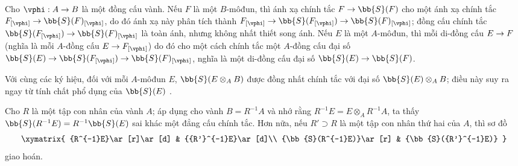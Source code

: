 \documentclass[oneside,10pt]{amsart}
\makeatletter
\newcommand{\ega@arrow}[2]{\mathchoice{#1}{#2}{#2}{#2}}
\renewcommand{\to}{\ega@arrow{\longrightarrow}{\rightarrow}}
\let\EGAOriginalLabel\label
\renewcommand{\label}[1]{\phantomsection\EGAOriginalLabel{#1}}
\makeatother
\begin{document}
\begin{env}[1.7.2]
\label{II.1.7.2}
Cho $\vphi:A\to B$ là một đồng cấu vành.
Nếu $F$ là một $B$-môđun, thì ánh xạ chính tắc $F\to\bb{S}(F)$ cho một ánh xạ chính tắc $F_{[\vphi]}\to\bb{S}(F)_{[\vphi]}$, do đó ánh xạ này phân tích thành $F_{[\vphi]}\to\bb{S}(F_{[\vphi]})\to\bb{S}(F)_{[\vphi]}$; đồng cấu chính tắc $\bb{S}(F_{[\vphi]})\to\bb{S}(F)_{[\vphi]}$ là toàn ánh, nhưng không nhất thiết song ánh.
Nếu $E$ là một $A$-môđun, thì mỗi di-đồng cấu $E\to F$ (nghĩa là mỗi $A$-đồng cấu $E\to F_{[\vphi]}$) do đó cho một cách chính tắc một $A$-đồng cấu đại số $\bb{S}(E)\to\bb{S}(F_{[\vphi]})\to\bb{S}(F)_{[\vphi]}$, nghĩa là một di-đồng cấu đại số $\bb{S}(E)\to\bb{S}(F)$.

Với cùng các ký hiệu, đối với mỗi $A$-môđun $E$, $\bb{S}(E\otimes_A B)$ được đồng nhất chính tắc với đại số $\bb{S}(E)\otimes_A B$; điều này suy ra ngay từ tính chất phổ dụng của $\bb{S}(E)$ .
\end{env}

\begin{env}[1.7.3]
\label{II.1.7.3}
Cho $R$ là một tập con nhân của vành $A$; áp dụng  cho vành $B=R^{-1}A$ và nhớ rằng $R^{-1}E=E\otimes_A R^{-1}A$, ta thấy $\bb{S}(R^{-1}E)=R^{-1}\bb{S}(E)$ sai khác một đẳng cấu chính tắc.
Hơn nữa, nếu $R'\supset R$ là một tập con nhân thứ hai của $A$, thì sơ đồ
\[
  \xymatrix{
    {R^{-1}E}\ar[r]\ar[d] & {{R'}^{-1}E}\ar[d]\\
    {\bb{S}(R^{-1}E)}\ar[r] & {\bb{S}({R'}^{-1}E)}
  }
\]
giao hoán.
\end{env}
\end{document}

